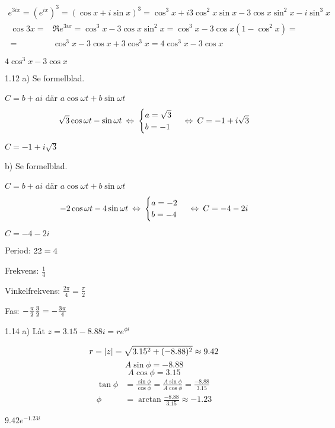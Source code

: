 \begin{task}{1.11}
	\begin{align*}
		e^{3ix}=
		(e^{ix})^3=
		(\cos x + i\sin x)^3=
		\cos^3x+i3\cos^2x\sin x-3\cos x\sin^2x-i\sin^3x
	\end{align*}
	\begin{align*}
	\cos 3x=
	&\Re e^{3ix}=
	\cos^3x-3\cos x\sin^2x=
	\cos^3x-3\cos x(1-\cos^2x)= \\ =
	&\cos^3x-3\cos x+3\cos^3x=
	4\cos^3x-3\cos x
	\end{align*}
	
	\ans $4\cos^3x-3\cos x$
\end{task}

\begin{task}{1.12 a)}
	Se formelblad.
	
	$C = b+ai$ där $a\cos\omega t + b\sin\omega t$
	\[\sqrt{3}\cos\omega t - \sin\omega t \lra
	\begin{cases}
	a=\sqrt{3} \\
	b=-1
	\end{cases} \lra
	C=-1+i\sqrt{3}\]
	
	\ans $C=-1+i\sqrt{3}$
\end{task}

\begin{task}{b)}
	Se formelblad.
	
	$C = b+ai$ där $a\cos\omega t + b\sin\omega t$
	\[-2\cos\omega t - 4\sin\omega t \lra
	\begin{cases}
	a=-2 \\
	b=-4
	\end{cases} \lra
	C=-4-2i\]
	
	\ans $C=-4-2i$
\end{task}

\begin{task}{1.13}
	Period: $2\*2=4$
	
	Frekvens: $\frac{1}{4}$
	
	Vinkelfrekvens: $\frac{2\pi}{4}=\frac{\pi}{2}$
	
	Fas: $-\frac{\pi}{2}\*\frac{3}{2}=-\frac{3\pi}{4}$
\end{task}

\begin{task}{1.14 a)}
	Låt $z=3.15-8.88i=re^{\phi i}$
	
	\[r=\left|z\right|=\sqrt{3.15^2+(-8.88)^2}\approx9.42\]
	\[A\sin\phi=-8.88\]
	\[A\cos\phi=3.15\]
	\begin{align*}
	\tan\phi&=
	\frac{\sin\phi}{\cos\phi}=
	\frac{A\sin\phi}{A\cos\phi}=
	\frac{-8.88}{3.15} \\
	\phi&=
	\arctan\frac{-8.88}{3.15}\approx 
	-1.23
	\end{align*}
	
	\ans $9.42e^{-1.23i}$
\end{task}

